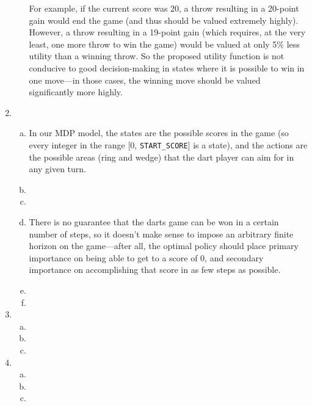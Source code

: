 \documentclass{article}
\begin{document}
\begin{enumerate}
\begin{enumerate}[(a)]
                For example, if the current score was 20, a throw resulting in a 20-point gain would end the game (and thus should be valued extremely highly). However, a throw resulting in a 19-point gain (which requires, at the very least, one more throw to win the game) would be valued at only 5\% less utility than a winning throw. So the proposed utility function is not conducive to good decision-making in states where it is possible to win in one move---in those cases, the winning move should be valued significantly more highly.
            \end{enumerate}
        \item
            \begin{enumerate}[(a)]
                \item In our MDP model, the states are the possible scores in the game (so every integer in the range [0, \texttt{START\_SCORE}] is a state), and the actions are the possible areas (ring and wedge) that the dart player can aim for in any given turn.
                \item %
                \item %
                \item There is no guarantee that the darts game can be won in a certain number of steps, so it doesn't make sense to impose an arbitrary finite horizon on the game---after all, the optimal policy should place primary importance on being able to get to a score of 0, and secondary importance on accomplishing that score in as few steps as possible.
                \item %
                \item %
            \end{enumerate}        
        \item
            \begin{enumerate}[(a)]
                \item %
                \item %
                \item %
            \end{enumerate}        
        \item
            \begin{enumerate}[(a)]
                \item %
                \item %
                \item %
            \end{enumerate}                
    \end{enumerate}
\end{document}
